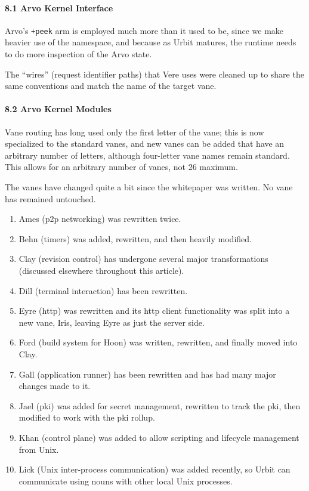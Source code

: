 \documentclass[twoside]{article}
\begin{document}
\paragraph{8.1 Arvo Kernel Interface}  Arvo's \lstinline[style=inlinecode]{+peek} arm is employed much more than it used to be, since we make heavier use of the namespace, and because as Urbit matures, the runtime needs to do more inspection of the Arvo state.

The ``wires'' (request identifier paths) that Vere uses were cleaned up to share the same conventions and match the name of the target vane.

\paragraph{8.2 Arvo Kernel Modules}  Vane routing has long used only the first letter of the vane; this is now specialized to the standard vanes, and new vanes can be added that have an arbitrary number of letters, although four-letter vane names remain standard.  This allows for an arbitrary number of vanes, not 26 maximum.

The vanes have changed quite a bit since the whitepaper was written.  No vane has remained untouched.

\begin{enumerate}
  \item  Ames (p2p networking) was rewritten twice.
  \item  Behn (timers) was added, rewritten, and then heavily modified.
  \item  Clay (revision control) has undergone several major transformations (discussed elsewhere throughout this article).
  \item  Dill (terminal interaction) has been rewritten.
  \item  Eyre ({\sc http}) was rewritten and its {\sc http} client functionality was split into a new vane, Iris, leaving Eyre as just the server side.
  \item  Ford (build system for Hoon) was written, rewritten, and finally moved into Clay.
  \item  Gall (application runner) has been rewritten and has had many major changes made to it.
  \item  Jael ({\sc pki}) was added for secret management, rewritten to track the {\sc pki}, then modified to work with the {\sc pki} rollup.
  \item  Khan (control plane) was added to allow scripting and lifecycle management from Unix.
  \item  Lick (Unix inter-process communication) was added recently, so Urbit can communicate using nouns with other local Unix processes.
\end{enumerate}
\end{document}
